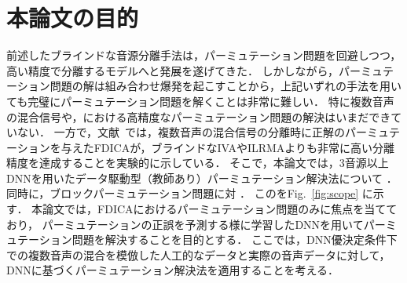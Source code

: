 \section{本論文の目的}
前述したブラインドな音源分離手法は，パーミュテーション問題を回避しつつ，高い精度で分離するモデルへと発展を遂げてきた．
しかしながら，パーミュテーション問題の解は組み合わせ爆発を起こすことから，上記いずれの手法を用いても完璧にパーミュテーション問題を解くことは非常に難しい．
特に複数音声の混合信号や，における高精度なパーミュテーション問題の解決はいまだできていない．
一方で，文献~\cite{EU}では，複数音声の混合信号の分離時に正解のパーミュテーションを与えたFDICAが，ブラインドなIVAやILRMAよりも非常に高い分離精度を達成することを実験的に示している．
そこで，本論文では，3音源以上 DNNを用いたデータ駆動型（教師あり）パーミュテーション解決法について  ．同時に，ブロックパーミュテーション問題に対  ．
このをFig.~\ref{fig:scope} に示す．
本論文では，FDICAにおけるパーミュテーション問題のみに焦点を当てており，
パーミュテーションの正誤を予測する様に学習したDNNを用いてパーミュテーション問題を解決することを目的とする．
ここでは，DNN優決定条件下での複数音声の混合を模倣した人工的なデータと実際の音声データに対して，DNNに基づくパーミュテーション解決法を適用することを考える．

